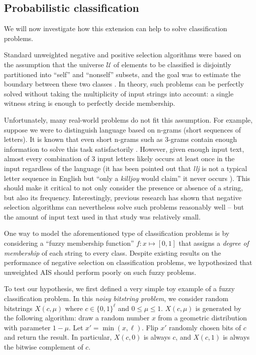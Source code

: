 \documentclass{llncs}
\begin{document}
\subsection{Probabilistic classification}

\label{sectionempirical}

We will now investigate how this extension can help to solve classification problems.

Standard unweighted negative and positive selection algorithms
were based on the assumption that the universe
$\mathcal{U}$ of elements to be classified is 
disjointly partitioned into ``self'' and ``nonself'' subsets, and the
goal was to estimate the boundary between these two classes \cite{Forrest1994,Timmis2008}.
In theory, such problems can be perfectly solved without taking the multiplicity of input
strings into account: a single witness string is enough to perfectly decide
membership.

Unfortunately, many real-world problems do not fit this assumption.
For example, suppose we were to distinguish language based on n-grams (short sequences of letters).
It is known that even short n-grams such as 3-grams contain enough information
to solve this task satisfactorily \cite{Dunning1996}. However, given enough input text, almost 
every combination of 3 input letters likely occurs at least once in the input
regardless of the language (it has been pointed out that \emph{llj}
is not a typical letter sequence in English but ``only a \emph{killjoy}
would claim'' it never occurs \cite{Dunning1996}). This should make it critical to not only consider
the presence or absence of a string, but also its frequency. Interestingly, 
previous research has shown that negative selection algorithms can nevertheless 
solve such problems reasonably well \cite{Wortel2020t} -- 
but the amount of input text used in that
study was relatively small. 

One way to model the aforementioned type of classification problems is by considering
a ``fuzzy membership function'' $f: x \mapsto [0,1]$ that assigns a \emph{degree of membership}
of each string to every class. Despite existing results on the performance of 
negative selection on classification problems, we hypothesized that unweighted AIS 
should perform poorly on such fuzzy problems.

To test our hypothesis, we first defined a very simple toy example of a
fuzzy classification problem. In this \emph{noisy bitstring problem}, we consider
random bitstrings $X(c,\mu)$ where $c \in \{0,1\}^\ell$ and $0 \leq \mu \leq 1$. 
$X(c,\mu)$ is generated by the following algorithm: draw a random number
$x$ from a geometric distribution with parameter $1-\mu$. Let $x' = \min(x,\ell)$.
Flip $x'$ randomly chosen bits of $c$ and return the result.
In particular, $X(c,0)$ is always $c$, and $X(c,1)$ is always the bitwise
complement of $c$. 
\end{document}
